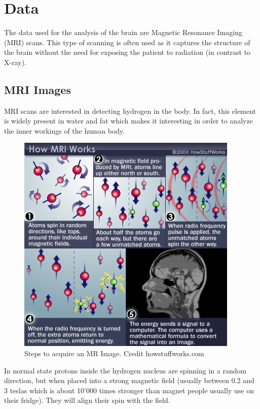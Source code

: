 \chapter{Data}
\label{chap:data}
The data used for the analysis of the brain are Magnetic Resonance Imaging (MRI) scans. This type of scanning is often used as it captures the structure of the brain without the need for exposing the patient to radiation (in contrast to X-ray).  

\section{MRI Images}
\label{sec:MRI}

MRI scans are interested in detecting hydrogen in the body. In fact, this element is widely present in water and fat which makes it interesting in order to analyze the inner workings of the human body.
\begin{figure}
 \centering
 \includegraphics[width=.9\linewidth]{figures/dataset/mri-steps.jpg}
 \captionsetup{width=.9\linewidth}
 \caption[bla]{Steps to acquire an MR Image. Credit howstuffworks.com\footnotemark}
 \label{fig:IXI_hospital_count}
\end{figure}

In normal state protons inside the hydrogen nucleus are spinning in a random direction, but when placed into a strong magnetic field (usually between 0.2 and 3 teslas which is about 10’000 times stronger than magnet people usually use on their fridge). They will align their spin with the field.

